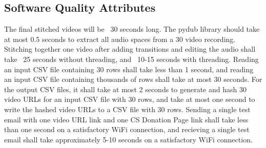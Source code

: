 \subsection{Software Quality Attributes}

The final stitched videos will be ~30 seconds long. The pydub library should take at most 0.5 seconds to extract
all audio spaces from a 30 video recording. Stitching together one video after adding transitions and editing the audio shall take
~25 seconds without threading, and ~10-15 seconds with threading. Reading an input CSV file containing 30 rows shall take less than
1 second, and reading an input CSV file containing thousands of rows shall take at most 30 seconds. For the output CSV files, it shall
take at most 2 seconds to generate and hash 30 video URLs for an input CSV file with 30 rows, and take at most one second to write the
hashed video URLs to a CSV file with 30 rows. Sending a single test email with one video URL link and one CS Donation Page link shall take
less than one second on a satisfactory WiFi connection, and recieving a single test email shall take approximately 5-10 seconds on a satisfactory
WiFi connection.


